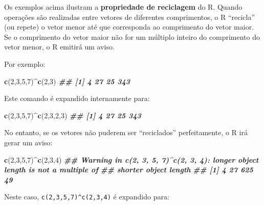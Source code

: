 \documentclass[
]{book}
\newenvironment{Shaded}{\begin{snugshade}}{\end{snugshade}}
\newcommand{\DecValTok}[1]{\textcolor[rgb]{0.00,0.00,0.81}{#1}}
\newcommand{\DocumentationTok}[1]{\textcolor[rgb]{0.56,0.35,0.01}{\textbf{\textit{#1}}}}
\newcommand{\FunctionTok}[1]{\textcolor[rgb]{0.13,0.29,0.53}{\textbf{#1}}}
\newcommand{\NormalTok}[1]{#1}
\newcommand{\SpecialCharTok}[1]{\textcolor[rgb]{0.81,0.36,0.00}{\textbf{#1}}}
\begin{document}
Os exemplos acima ilustram a \textbf{propriedade de reciclagem} do R. Quando
operações são realizadas entre vetores de diferentes comprimentos, o R
``recicla'' (ou repete) o vetor menor até que corresponda ao comprimento
do vetor maior. Se o comprimento do vetor maior não for um múltiplo
inteiro do comprimento do vetor menor, o R emitirá um aviso.

Por exemplo:

\begin{Shaded}
\begin{Highlighting}[]
\FunctionTok{c}\NormalTok{(}\DecValTok{2}\NormalTok{,}\DecValTok{3}\NormalTok{,}\DecValTok{5}\NormalTok{,}\DecValTok{7}\NormalTok{)}\SpecialCharTok{\^{}}\FunctionTok{c}\NormalTok{(}\DecValTok{2}\NormalTok{,}\DecValTok{3}\NormalTok{)}
\DocumentationTok{\#\# [1]   4  27  25 343}
\end{Highlighting}
\end{Shaded}

Este comando é expandido internamente para:

\begin{Shaded}
\begin{Highlighting}[]
\FunctionTok{c}\NormalTok{(}\DecValTok{2}\NormalTok{,}\DecValTok{3}\NormalTok{,}\DecValTok{5}\NormalTok{,}\DecValTok{7}\NormalTok{)}\SpecialCharTok{\^{}}\FunctionTok{c}\NormalTok{(}\DecValTok{2}\NormalTok{,}\DecValTok{3}\NormalTok{,}\DecValTok{2}\NormalTok{,}\DecValTok{3}\NormalTok{)}
\DocumentationTok{\#\# [1]   4  27  25 343}
\end{Highlighting}
\end{Shaded}

No entanto, se os vetores não puderem ser ``reciclados'' perfeitamente, o
R irá gerar um aviso:

\begin{Shaded}
\begin{Highlighting}[]
\FunctionTok{c}\NormalTok{(}\DecValTok{2}\NormalTok{,}\DecValTok{3}\NormalTok{,}\DecValTok{5}\NormalTok{,}\DecValTok{7}\NormalTok{)}\SpecialCharTok{\^{}}\FunctionTok{c}\NormalTok{(}\DecValTok{2}\NormalTok{,}\DecValTok{3}\NormalTok{,}\DecValTok{4}\NormalTok{)}
\DocumentationTok{\#\# Warning in c(2, 3, 5, 7)\^{}c(2, 3, 4): longer object length is not a multiple of}
\DocumentationTok{\#\# shorter object length}
\DocumentationTok{\#\# [1]   4  27 625  49}
\end{Highlighting}
\end{Shaded}

Neste caso, \texttt{c(2,3,5,7)\^{}c(2,3,4)} é expandido para:
\end{document}
